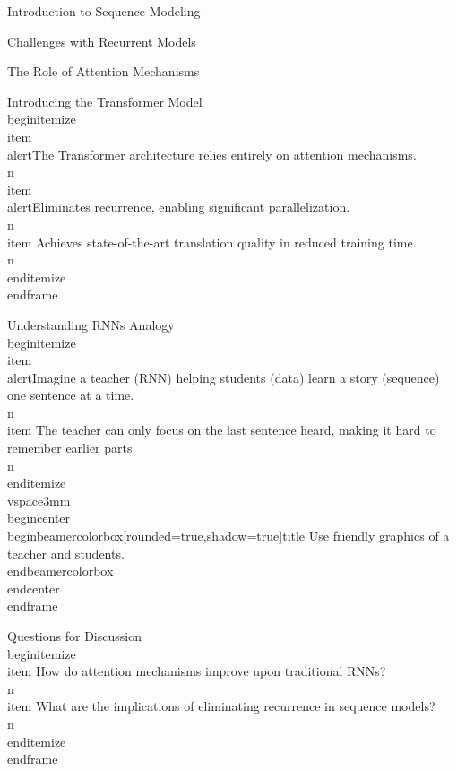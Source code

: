 \documentclass{beamer}
\begin{document}
\begin{frame}[]{Introduction to Sequence Modeling}
\begin{frame}[]{Challenges with Recurrent Models}
\begin{frame}[]{The Role of Attention Mechanisms}
\endgroup

\begingroup
{}\n{}\n\begin{frame}[]{Introducing the Transformer Model}\n\\begin{itemize}
\\item \\alert{The Transformer architecture relies entirely on attention mechanisms.}\\n\\item \\alert{Eliminates recurrence, enabling significant parallelization.}\\n\\item Achieves state-of-the-art translation quality in reduced training time.\\n\\end{itemize}
\\end{frame}

\endgroup

\begingroup
{}\n{}\n\begin{frame}[plain]{Understanding RNNs Analogy}\n\\begin{itemize}
\\item \\alert{Imagine a teacher (RNN) helping students (data) learn a story (sequence) one sentence at a time.}\\n\\item The teacher can only focus on the last sentence heard, making it hard to remember earlier parts.\\n\\end{itemize}
\\vspace{3mm}
\\begin{center}
\\begin{beamercolorbox}[rounded=true,shadow=true]{title}
Use friendly graphics of a teacher and students.
\\end{beamercolorbox}
\\end{center}
\\end{frame}

\endgroup

\begingroup
{}\n{}\n\begin{frame}[]{Questions for Discussion}\n\\begin{itemize}
\\item How do attention mechanisms improve upon traditional RNNs?\\n\\item What are the implications of eliminating recurrence in sequence models?\\n\\end{itemize}
\\end{frame}


\end{frame}
\end{frame}
\end{frame}
\end{frame}
\end{frame}
\end{frame}
\end{document}
